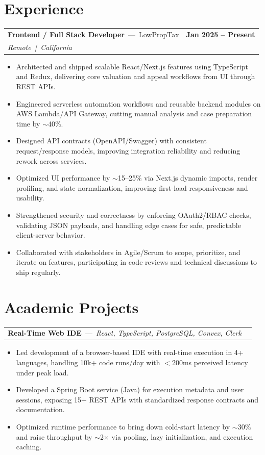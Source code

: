 \documentclass[11pt]{article}
\newcommand{\resumeSubheading}[4]{%
  \begin{tabularx}{\textwidth}{X r}
    \textbf{#1} \,---\, #2 & \textbf{#3} \\
    \textit{#4} & \\
  \end{tabularx}
}
\newcommand{\projectHeading}[3]{%
  \begin{tabularx}{\textwidth}{X r}
    \textbf{#1} \,---\, \textit{#2} & \textbf{#3} \\
  \end{tabularx}
}
\begin{document}
\section*{Experience}
\resumeSubheading
{Frontend / Full Stack Developer}{LowPropTax}{Jan 2025 -- Present}{Remote \,|\, California}
\begin{itemize}
  \item Architected and shipped scalable React/Next.js features using TypeScript and Redux, delivering core valuation and appeal workflows from UI through REST APIs.
  \item Engineered serverless automation workflows and reusable backend modules on AWS Lambda/API Gateway, cutting manual analysis and case preparation time by \(\sim\)40\%.
  \item Designed API contracts (OpenAPI/Swagger) with consistent request/response models, improving integration reliability and reducing rework across services.
  \item Optimized UI performance by \(\sim\)15--25\% via Next.js dynamic imports, render profiling, and state normalization, improving first-load responsiveness and usability.
  \item Strengthened security and correctness by enforcing OAuth2/RBAC checks, validating JSON payloads, and handling edge cases for safe, predictable client-server behavior.
  \item Collaborated with stakeholders in Agile/Scrum to scope, prioritize, and iterate on features, participating in code reviews and technical discussions to ship regularly.
\end{itemize}

\section*{Academic Projects}
\projectHeading
{Real-Time Web IDE}{React, TypeScript, PostgreSQL, Convex, Clerk}{}
\begin{itemize}
  \item Led development of a browser-based IDE with real-time execution in 4+ languages, handling 10k+ code runs/day with \(<200\)ms perceived latency under peak load.
  \item Developed a Spring Boot service (Java) for execution metadata and user sessions, exposing 15+ REST APIs with standardized response contracts and documentation.
  \item Optimized runtime performance to bring down cold-start latency by \(\sim\)30\% and raise throughput by \(\sim\)2$\times$ via pooling, lazy initialization, and execution caching.
\end{itemize}
\end{document}
